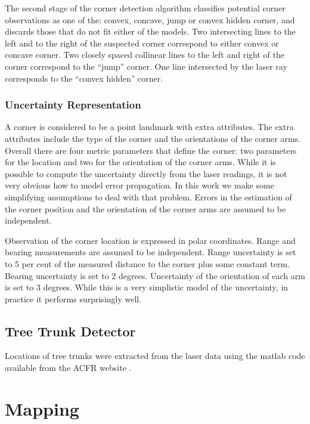 The second stage of the corner detection algorithm classifies potential
corner observations as one of the: convex, concave, jump or convex
hidden corner, and discards those that do not fit either of the
models. Two intersecting lines to the left and to the right of the
suspected corner correspond to either convex or concave corner. Two
closely spaced collinear lines to the left and right of the corner
correspond to the ``jump'' corner. One line intersected by the laser
ray corresponds to the ``convex hidden'' corner.


\subsubsection{Uncertainty Representation}

A corner is considered to be a point landmark with extra attributes.
The extra attributes include the type of the corner and the
orientations of the corner arms. Overall there are four metric
parameters that define the corner: two parameters for the location and
two for the orientation of the corner arms. While it is possible to
compute the uncertainty directly from the laser readings, it is not
very obvious how to model error propagation. In this work we make some
simplifying assumptions to deal with that problem.  Errors in the
estimation of the corner position and the orientation of the corner
arms are assumed to be independent.

Observation of the corner location is expressed in polar coordinates.
Range and bearing measurements are assumed to be independent. Range
uncertainty is set to 5 per cent of the measured distance to the
corner plus some constant term.  Bearing uncertainty is set to 2
degrees. Uncertainty of the orientation of each arm is set to 3
degrees. While this is a very simplistic model of the uncertainty, in
practice it performs surprisingly well.


\subsection{Tree Trunk Detector}

Locations of tree trunks were extracted from the laser data using the
matlab code available from the ACFR website \cite{VP_dataset}.


\section{Mapping}

